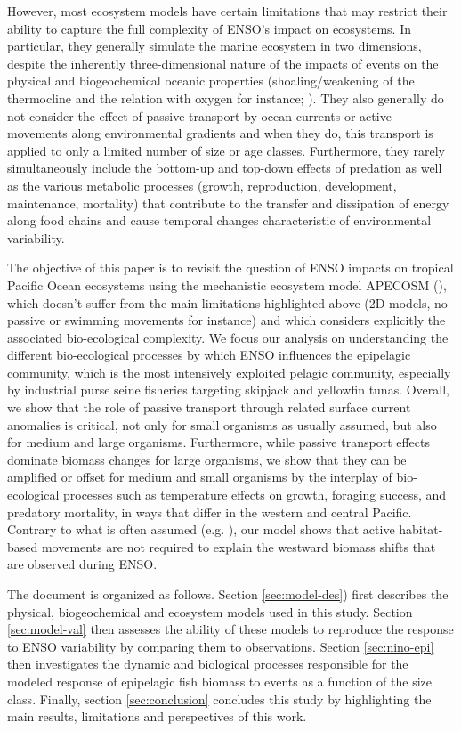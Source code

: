 However, most ecosystem models have certain limitations that may restrict their ability to capture the full complexity of ENSO's impact on ecosystems. In particular, they generally simulate the marine ecosystem in two dimensions, despite the  inherently three-dimensional nature of the impacts of \nino{} events on the physical and biogeochemical oceanic properties  (shoaling/weakening of the thermocline and the relation with oxygen for instance; \citealp{leungENSODrivesNearsurface2019}). They also generally do not consider the effect of passive transport by ocean currents or active movements along environmental gradients and when they do, this transport is applied  to only a limited number of size or age classes. Furthermore, they rarely simultaneously include  the bottom-up and top-down effects of predation as well as the various metabolic processes (growth, reproduction, development, maintenance, mortality) that contribute to the transfer and dissipation of energy along food chains and cause temporal changes characteristic of environmental variability. 

The objective of this paper is to revisit the question of ENSO impacts on tropical Pacific Ocean ecosystems using the mechanistic ecosystem model APECOSM (\citealp{mauryOverviewAPECOSMSpatialized2010}), which doesn't suffer from the main limitations highlighted above (2D models, no passive or swimming movements for instance) and which considers explicitly the associated bio-ecological complexity. We focus our analysis on understanding the different bio-ecological processes by which ENSO influences the epipelagic community, which is  the most intensively exploited pelagic community, especially by industrial purse seine fisheries targeting skipjack and yellowfin tunas. Overall, we show that the role of passive transport through \nino{} related surface current anomalies is critical, not only for small organisms as usually assumed, but also for medium and large organisms. Furthermore, while passive transport effects dominate biomass changes for large organisms, we show that they can be amplified or offset for medium and small organisms by the interplay of bio-ecological processes such as temperature effects on growth, foraging success, and predatory mortality, in ways that differ in the western and central Pacific. Contrary to what is often assumed (e.g. \citealt{lehodeyPelagicEcosystemTropical2001, lehodeyENSOImpactMarine2020}), our model shows that active habitat-based movements are not required to explain the westward biomass shifts that are observed during ENSO.

The document is organized as follows. Section \ref{sec:model-des}) first describes the physical, biogeochemical and ecosystem models used in this study. Section \ref{sec:model-val} then assesses the ability of these models to reproduce the response to ENSO variability by comparing them to observations. Section \ref{sec:nino-epi} then investigates the dynamic and biological processes responsible for the modeled response of epipelagic fish biomass to \nino{} events as a function of the size class. Finally, section \ref{sec:conclusion} concludes this study by highlighting the main results, limitations and perspectives of this work. 
